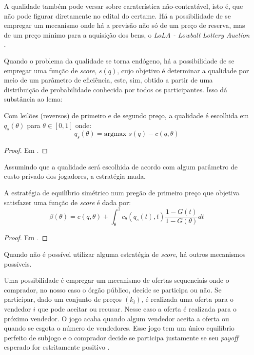 A qualidade também pode versar sobre caraterística não-contratável, isto é, que não pode figurar diretamente no edital do certame. Há a possibilidade de se empregar um mecanismo onde há a previsão não só de um preço de reserva, mas de um preço mínimo para a aquisição dos bens, o \emph{LoLA - Lowball Lottery Auction} \citet{villa:2022}.

Quando o problema da qualidade se torna endógeno, há a possibilidade de se empregar uma função de \emph{score}, $s(q)$, cujo objetivo é determinar a qualidade por meio de um parâmetro de eficiência, este, sim, obtido a partir de uma distribuição de probabilidade conhecida por todos os participantes. Isso dá substância ao lema:

\begin{lema}
	\label{lema:qualidade-parametrizada}
	Com leilões (reversos) de primeiro e de segundo preço, a qualidade é escolhida em $q_s(\theta)$ para $\theta \in [0, 1]$ onde:
	\begin{equation}
		q_s(\theta) = \text{argmax } s(q) - c(q, \theta)
	\end{equation}
\end{lema}
\begin{proof}
	Em \citet{Che1993}.
\end{proof}

Assumindo que a qualidade será escolhida de acordo com algum parâmetro de custo privado dos jogadores, a estratégia muda.

\begin{proposicao}
	A estratégia de equilíbrio simétrico num pregão de primeiro preço que objetiva satisfazer uma função de \emph{score} é dada por:
	\begin{equation}
		\beta(\theta) = c(q, \theta) + \int_{\theta}^1 c_{\theta}(q_s(t), t) \frac{1-G(t)}{1-G(\theta)} dt
	\end{equation}
\end{proposicao}
\begin{proof}
	Em \citet{Che1993}.
\end{proof}

Quando não é possível utilizar alguma estratégia de \emph{score}, há outros mecanismos possíveis.

Uma possibilidade é empregar um mecanismo de ofertas sequenciais onde o comprador, no nosso caso o órgão público, decide se participa ou não. Se participar, dado um conjunto de preços $(k_i)$, é realizada uma oferta para o vendedor $i$ que pode aceitar ou recusar. Nesse caso a oferta é realizada para o próximo vendedor. O jogo acaba quando algum vendedor aceita a oferta ou quando se esgota o número de vendedores. Esse jogo tem um único equilíbrio perfeito de subjogo e o comprador decide se participa justamente se seu \emph{payoff} esperado for estritamente positivo \citet{Manelli1995}.

